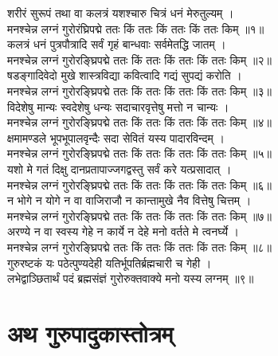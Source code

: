 शरीरं सुरूपं तथा वा कलत्रं यशश्चारु चित्रं धनं मेरुतुल्यम् ।\\
मनश्चेन्न लग्नं गुरोरंघ्रिपद्मे ततः किं ततः किं ततः किं ततः किम् ॥१॥\\
कलत्रं धनं पुत्रपौत्रादि सर्वं गृहं बान्धवाः सर्वमेतद्धि जातम् ।\\
मनश्चेन्न लग्नं गुरोरङ्घ्रिपद्मे ततः किं ततः किं ततः किं ततः किम् ॥२॥\\
षडङ्गादिवेदो मुखे शास्त्रविद्या कवित्वादि गद्यं सुपद्यं करोति ।\\
मनश्चेन्न लग्नं गुरोरङ्घ्रिपद्मे ततः किं ततः किं ततः किं ततः किम् ॥३॥\\
विदेशेषु मान्यः स्वदेशेषु धन्यः सदाचारवृत्तेषु मत्तो न चान्यः ।\\
मनश्चेन्न लग्नं गुरोरङ्घ्रिपद्मे ततः किं ततः किं ततः किं ततः किम् ॥४॥\\
क्षमामण्डले भूपभूपालवृन्दैः सदा सेवितं यस्य पादारविन्दम् ।\\
मनश्चेन्न लग्नं गुरोरङ्घ्रिपद्मे ततः किं ततः किं ततः किं ततः किम् ॥५॥\\
यशो मे गतं दिक्षु दानप्रतापाज्जगद्वस्तु सर्वं करे यत्प्रसादात् ।\\
मनश्चेन्न लग्नं गुरोरङ्घ्रिपद्मे ततः किं ततः किं ततः किं ततः किम् ॥६॥\\
न भोगे न योगे न वा वाजिराजौ न कान्तामुखे नैव वित्तेषु चित्तम् ।\\
मनश्चेन्न लग्नं गुरोरङ्घ्रिपद्मे ततः किं ततः किं ततः किं ततः किम् ॥७॥\\
अरण्ये न वा स्वस्य गेहे न कार्ये न देहे मनो वर्तते मे त्वनर्घ्ये ।\\
मनश्चेन्न लग्नं गुरोरङ्घ्रिपद्मे ततः किं ततः किं ततः किं ततः किम् ॥८॥\\
गुरुरष्टकं यः पठेत्पुण्यदेही यतिर्भूपतिर्ब्रह्मचारी च गेही ।\\
लभेद्वाञ्छितार्थं पदं ब्रह्मसंज्ञं गुरोरुक्तवाक्ये मनो यस्य लग्नम् ॥९॥\\

\section{अथ  गुरुपादुकास्तोत्रम्}


